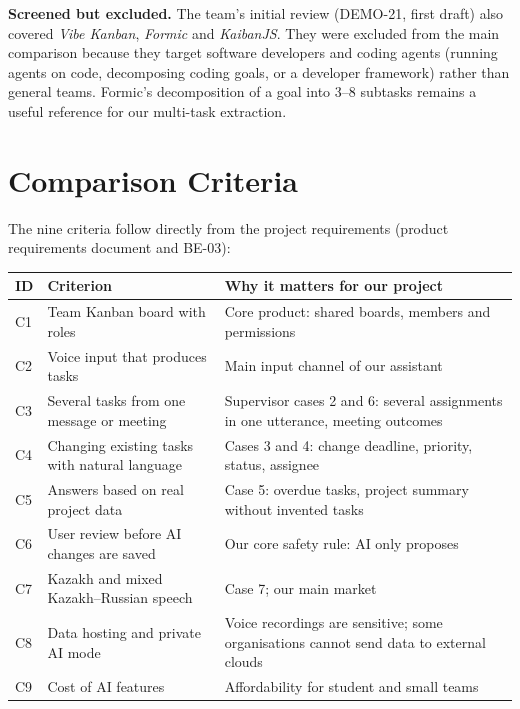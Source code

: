 \documentclass[11pt,a4paper]{article}
\newcommand{\tblstart}{\small\rowcolors{2}{gray!7}{white}}
\begin{document}
\textbf{Screened but excluded.} The team's initial review (DEMO-21, first draft) also covered \textit{Vibe Kanban}, \textit{Formic} and \textit{KaibanJS}. They were excluded from the main comparison because they target software developers and coding agents (running agents on code, decomposing coding goals, or a developer framework) rather than general teams. Formic's decomposition of a goal into 3--8 subtasks remains a useful reference for our multi-task extraction.

\section{Comparison Criteria}

The nine criteria follow directly from the project requirements (product requirements document and BE-03):

{\tblstart
\begin{xltabular}{\textwidth}{P{0.9cm} P{4.8cm} L}
\toprule
\textbf{ID} & \textbf{Criterion} & \textbf{Why it matters for our project} \\
\midrule
\endhead
C1 & Team Kanban board with roles & Core product: shared boards, members and permissions \\
C2 & Voice input that produces tasks & Main input channel of our assistant \\
C3 & Several tasks from one message or meeting & Supervisor cases 2 and 6: several assignments in one utterance, meeting outcomes \\
C4 & Changing existing tasks with natural language & Cases 3 and 4: change deadline, priority, status, assignee \\
C5 & Answers based on real project data & Case 5: overdue tasks, project summary without invented tasks \\
C6 & User review before AI changes are saved & Our core safety rule: AI only proposes \\
C7 & Kazakh and mixed Kazakh--Russian speech & Case 7; our main market \\
C8 & Data hosting and private AI mode & Voice recordings are sensitive; some organisations cannot send data to external clouds \\
C9 & Cost of AI features & Affordability for student and small teams \\
\bottomrule
\end{xltabular}}
\end{document}
